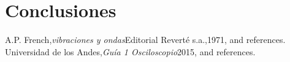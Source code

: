 \documentclass[%
 reprint,
 amsmath,amssymb,
 aps,
]{revtex4-1}
\begin{document}
\section{\label{sec:level1}Conclusiones}



\begin{thebibliography}{99} 
 A.P. French,{\it vibraciones y ondas}{Editorial Reverté s.a.,1971}, and references.\\ 
 Universidad de los Andes,{\it Guía 1 Osciloscopio}{2015}, and references.\\ \end{thebibliography}
\end{document}
